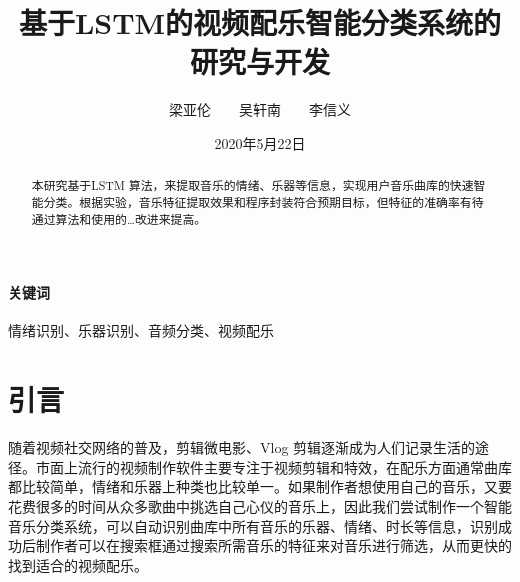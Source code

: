 \documentclass[a4paper,utf8,10pt]{article}
\title{基于LSTM的视频配乐智能分类系统的研究与开发}
\author{梁亚伦　　吴轩南　　李信义}
\date{2020年5月22日}
\begin{document}
\maketitle

\begin{abstract}
本研究基于LSTM 算法，来提取音乐的情绪、乐器等信息，实现用户音乐曲库的快速智能分类。根据实验，音乐特征提取效果和程序封装符合预期目标，但特征的准确率有待通过算法和使用的…改进来提高。
\end{abstract}

\paragraph{关键词} 情绪识别、乐器识别、音频分类、视频配乐
\vspace{\baselineskip}

\section{引言}

随着视频社交网络的普及，剪辑微电影、Vlog 剪辑逐渐成为人们记录生活的途径。市面上流行的视频制作软件主要专注于视频剪辑和特效，在配乐方面通常曲库都比较简单，情绪和乐器上种类也比较单一。如果制作者想使用自己的音乐，又要花费很多的时间从众多歌曲中挑选自己心仪的音乐上，因此我们尝试制作一个智能音乐分类系统，可以自动识别曲库中所有音乐的乐器、情绪、时长等信息，识别成功后制作者可以在搜索框通过搜索所需音乐的特征来对音乐进行筛选，从而更快的找到适合的视频配乐。
\end{document}
